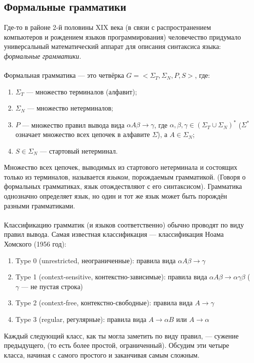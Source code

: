 \documentclass[11pt]{book}
\begin{document}
\subsection{Формальные грамматики}
Где-то в районе 2-й половины XIX века
(в связи с распространением компьютеров и рождением языков программирования)
человечество придумало универсальный математический аппарат для описания синтаксиса языка: \emph{формальные грамматики}.
\\ \\
Формальная грамматика --- это четвёрка $G=<\Sigma_T,\Sigma_N,P,S>$, где:
\begin{enumerate}
\item $\Sigma_T$ --- множество терминалов (алфавит);
\item $\Sigma_N$ --- множество нетерминалов;
\item $P$ --- множество правил вывода вида $\alpha A \beta \rightarrow \gamma$,
где $\alpha, \beta, \gamma \in (\Sigma_T \cup \Sigma_N)^*$ ($\Sigma^*$ означает множество всех цепочек в алфавите $\Sigma$),
а $A \in \Sigma_N$;
\item $S \in \Sigma_N$ --- стартовый нетерминал.
\end{enumerate}
Множество всех цепочек, выводимых из стартового нетерминала и состоящих только из терминалов, называется \emph{языком},
порождаемым грамматикой.
(Говоря о формальных грамматиках, язык отождествляют с его синтаксисом).
Грамматика однозначно определяет язык, но один и тот же язык может быть порождён разными грамматиками.
\\ \\
Классификацию грамматик (и языков соответственно) обычно проводят по виду правил вывода.
Самая известная классификация --- классификация Ноама Хомского (1956 год):
\begin{enumerate}
\item Type 0 (unrestricted, неограниченные): правила вида $\alpha A \beta \rightarrow \gamma$
\item Type 1 (context-sensitive, контекстно-зависимые): правила вида $\alpha A \beta \rightarrow \alpha \gamma \beta$ ($\gamma$ --- не пустая строка)
\item Type 2 (context-free, контекстно-свободные): правила вида $A \rightarrow \gamma$
\item Type 3 (regular, регулярные): правила вида $A \rightarrow \alpha B$ или $A \rightarrow \alpha$
\end{enumerate}
Каждый следующий класс, как ты могла заметить по виду правил, --- сужение предыдущего, (то есть более простой, ограниченный).
Обсудим эти четыре класса, начиная с самого простого и заканчивая самым сложным.
\end{document}
